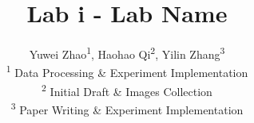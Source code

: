 \title{
  \textbf{Lab i - Lab Name}
}
\author{
  Yuwei Zhao\textsuperscript{1},
  Haohao Qi\textsuperscript{2},
  Yilin Zhang\textsuperscript{3} \\
  \small\textsuperscript{1}
  Data Processing \& Experiment Implementation \\
  \small\textsuperscript{2}
  Initial Draft \& Images Collection \\
  \small\textsuperscript{3}
  Paper Writing \& Experiment Implementation
}
\date{}